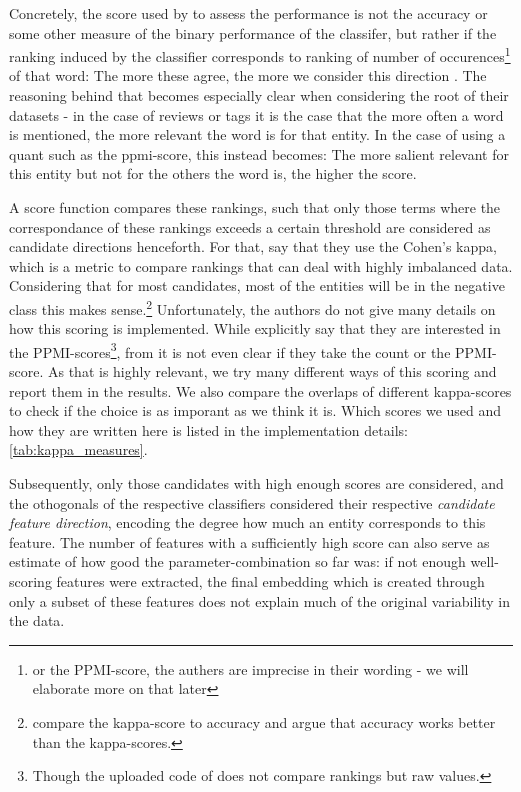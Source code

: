 Concretely, the score used by \cite{Derrac2015} to assess the performance is not the accuracy or some other measure of the binary performance of the classifer, but rather if the ranking induced by the classifier corresponds to ranking of number of occurences\footnote{or the PPMI-score, the authers are imprecise in their wording - we will elaborate more on that later} of that word: The more these agree, the more we consider this direction  \cite[20]{Derrac2015}. The reasoning behind that becomes especially clear when considering the root of their datasets - in the case of reviews or tags it is the case that the more often a word is mentioned, the more relevant the word is for that entity. In the case of using a \gls{quant} such as the \gls{ppmi}-score, this instead becomes: The more salient relevant for this entity but not for the others the word is, the higher the score.

A score function compares these rankings, such that only those terms where the correspondance of these rankings exceeds a certain threshold are considered as candidate directions henceforth. For that, \textcite{Derrac2015} say that they use the Cohen's kappa, which is a metric to compare rankings that can deal with highly imbalanced data. Considering that for most candidates, most of the entities will be in the negative class this makes sense.\footnote{\textcite{Ager2018} compare the kappa-score to accuracy and argue that accuracy works better than the kappa-scores.} Unfortunately, the authors do not give many details on how this scoring is implemented. While \cite{Ager2018,Alshaikh2020} explicitly say that they are interested in the PPMI-scores\footnote{Though the uploaded code of \cite{Alshaikh2020} does not compare rankings but raw values.}, from \cite{Derrac2015} it is not even clear if they take the count or the PPMI-score. As that is highly relevant, we try many different ways of this scoring and report them in the results. We also compare the overlaps of different kappa-scores to check if the choice is as imporant as we think it is. Which scores we used and how they are written here is listed in the implementation details: \autoref{tab:kappa_measures}.

Subsequently, only those candidates with high enough scores are considered, and the othogonals of the respective classifiers considered their respective \textit{candidate feature direction}, encoding the degree how much an entity corresponds to this feature. The number of features with a sufficiently high score can also serve as estimate of how good the parameter-combination so far was: if not enough well-scoring features were extracted, the final embedding which is created through only a subset of these features does not explain much of the original variability in the data.

